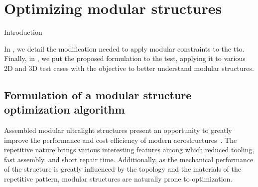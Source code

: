 \setchapterpreamble[u]{\margintoc}
\glsresetall %
\chapter{Optimizing modular structures}
Introduction



In , we detail the modification needed to apply modular constraints to the \gls{tto}. Finally, in , we put the proposed formulation to the test, applying it to various 2D and 3D test cases with the objective to better understand modular structures.
\section{Formulation of a modular structure optimization algorithm} \label{sec:05_01}
Assembled modular ultralight structures present an opportunity to greatly improve the performance and cost efficiency of modern aerostructures~. The repetitive nature brings various interesting features among which reduced tooling, fast assembly, and short repair time. Additionally, as the mechanical performance of the structure is greatly influenced by the topology and the materials of the repetitive pattern, modular structures are naturally prone to optimization.

